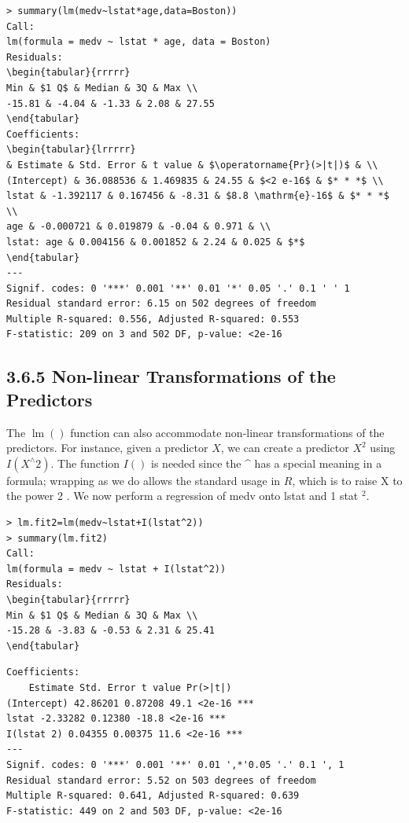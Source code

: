 \documentclass[10pt]{article}
\begin{document}
\begin{verbatim}
> summary(lm(medv~lstat*age,data=Boston))
Call:
lm(formula = medv ~ lstat * age, data = Boston)
Residuals:
\begin{tabular}{rrrrr} 
Min & $1 Q$ & Median & 3Q & Max \\
-15.81 & -4.04 & -1.33 & 2.08 & 27.55
\end{tabular}
Coefficients:
\begin{tabular}{lrrrrr} 
& Estimate & Std. Error & t value & $\operatorname{Pr}(>|t|)$ & \\
(Intercept) & 36.088536 & 1.469835 & 24.55 & $<2 e-16$ & $* * *$ \\
lstat & -1.392117 & 0.167456 & -8.31 & $8.8 \mathrm{e}-16$ & $* * *$ \\
age & -0.000721 & 0.019879 & -0.04 & 0.971 & \\
lstat: age & 0.004156 & 0.001852 & 2.24 & 0.025 & $*$
\end{tabular}
---
Signif. codes: 0 '***' 0.001 '**' 0.01 '*' 0.05 '.' 0.1 ' ' 1
Residual standard error: 6.15 on 502 degrees of freedom
Multiple R-squared: 0.556, Adjusted R-squared: 0.553
F-statistic: 209 on 3 and 502 DF, p-value: <2e-16
\end{verbatim}

\subsection*{3.6.5 Non-linear Transformations of the Predictors}
The $\operatorname{lm}()$ function can also accommodate non-linear transformations of the predictors. For instance, given a predictor $X$, we can create a predictor $X^{2}$ using $I\left(X^{\wedge} 2\right)$. The function $I()$ is needed since the \^{} has a special meaning in a formula; wrapping as we do allows the standard usage in $R$, which is to raise X to the power 2 . We now perform a regression of medv onto lstat and 1 stat ${ }^{2}$.

\begin{verbatim}
> lm.fit2=lm(medv~lstat+I(lstat^2))
> summary(lm.fit2)
Call:
lm(formula = medv ~ lstat + I(lstat^2))
Residuals:
\begin{tabular}{rrrrr} 
Min & $1 Q$ & Median & 3Q & Max \\
-15.28 & -3.83 & -0.53 & 2.31 & 25.41
\end{tabular}
\end{verbatim}

\begin{verbatim}
Coefficients:
    Estimate Std. Error t value Pr(>|t|)
(Intercept) 42.86201 0.87208 49.1 <2e-16 ***
lstat -2.33282 0.12380 -18.8 <2e-16 ***
I(lstat 2) 0.04355 0.00375 11.6 <2e-16 ***
---
Signif. codes: 0 '***' 0.001 '**' 0.01 ',*'0.05 '.' 0.1 ', 1
Residual standard error: 5.52 on 503 degrees of freedom
Multiple R-squared: 0.641, Adjusted R-squared: 0.639
F-statistic: 449 on 2 and 503 DF, p-value: <2e-16
\end{verbatim}
\end{document}
